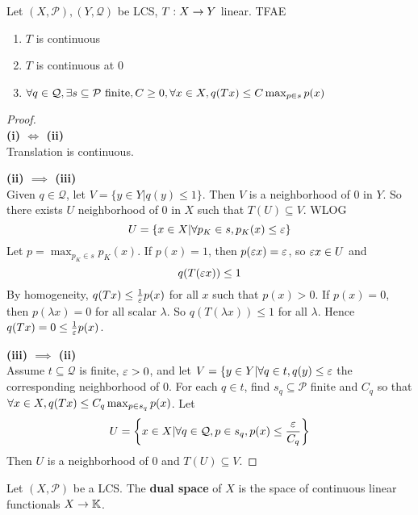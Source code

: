 \documentclass{article}
\begin{document}
\begin{nlemma}\label{lem:lcs-continuity}
  Let $(X, \mathcal P), (Y, \mathcal Q)$ be LCS, $T : X \rightarrow Y$ linear. TFAE
  \begin{enumerate}
    \item $T$ is continuous
    \item $T$ is continuous at $0$
    \item $\forall q \in \mathcal Q, \exists s \subseteq \mathcal P \text{ finite}, C \ge 0, \forall x \in X, q(Tx) \le C\max_{p \in s} p(x)$
  \end{enumerate}
\end{nlemma}
\begin{proof}~\\
  {\bf (i) $\iff$ (ii)} \\
  Translation is continuous.

  {\bf (ii) $\implies$ (iii)} \\
  Given $q \in \mathcal Q$, let $V = \{y \in Y | q(y) \le 1\}$. Then $V$ is a neighborhood of $0$ in $Y$. So there exists $U$ neighborhood of $0$ in $X$ such that $T(U) \subseteq V$. WLOG
  $$U = \{x \in X | \forall p_K \in s, p_K(x) \le \varepsilon\}$$
  Let $p = \max_{p_K \in s} p_K(x)$. If $p(x) = 1$, then $p(\varepsilon x) = \varepsilon$, so $\varepsilon x \in U$ and
  $$q(T(\varepsilon x)) \le 1$$
  By homogeneity, $q(Tx) \le \frac 1{\varepsilon} p(x)$ for all $x$ such that $p(x) > 0$. If $p(x) = 0$, then $p(\lambda x) = 0$ for all scalar $\lambda$. So $q(T(\lambda x)) \le 1$ for all $\lambda$. Hence $q(Tx) = 0 \le \frac 1{\varepsilon} p(x)$.

  {\bf (iii) $\implies$ (ii)} \\
  Assume $t \subseteq \mathcal Q$ is finite, $\varepsilon > 0$, and let $V = \{y \in Y | \forall q \in t, q(y) \le \varepsilon$ the corresponding neighborhood of $0$. For each $q \in t$, find $s_q \subseteq \mathcal P$ finite and $C_q$ so that $\forall x \in X, q(Tx) \le C_q\max_{p \in s_q}p(x)$. Let
  $$U = \left\{x \in X | \forall q \in \mathcal Q, p \in s_q, p(x) \le \frac{\varepsilon}{C_q}\right\}$$
  Then $U$ is a neighborhood of $0$ and $T(U) \subseteq V$.
\end{proof}

\begin{defi}
  Let $(X, \mathcal P)$ be a LCS. The {\bf dual space} of $X$ is the space of continuous linear functionals $X \rightarrow \mathbb K$.
\end{defi}

\newlec
\end{document}
